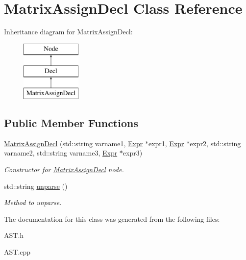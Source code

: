 \hypertarget{classMatrixAssignDecl}{\section{Matrix\-Assign\-Decl Class Reference}
\label{classMatrixAssignDecl}
}
Inheritance diagram for Matrix\-Assign\-Decl\-:\begin{figure}[H]
\begin{center}
\leavevmode
\includegraphics[height=3.000000cm]{classMatrixAssignDecl}
\end{center}
\end{figure}
\subsection*{Public Member Functions}
\begin{DoxyCompactItemize}
\item 
\hypertarget{classMatrixAssignDecl_a0a85b5acfef41aadd1a9a7f973e833f2}{\hyperlink{classMatrixAssignDecl_a0a85b5acfef41aadd1a9a7f973e833f2}{Matrix\-Assign\-Decl} (std\-::string varname1, \hyperlink{classExpr}{Expr} $\ast$expr1, \hyperlink{classExpr}{Expr} $\ast$expr2, std\-::string varname2, std\-::string varname3, \hyperlink{classExpr}{Expr} $\ast$expr3)}\label{classMatrixAssignDecl_a0a85b5acfef41aadd1a9a7f973e833f2}

\begin{DoxyCompactList}\small\item\em Constructor for \hyperlink{classMatrixAssignDecl}{Matrix\-Assign\-Decl} node. \end{DoxyCompactList}\item 
\hypertarget{classMatrixAssignDecl_a75fe092e7f4f5e138b4a79b8a6e86ca4}{std\-::string \hyperlink{classMatrixAssignDecl_a75fe092e7f4f5e138b4a79b8a6e86ca4}{unparse} ()}\label{classMatrixAssignDecl_a75fe092e7f4f5e138b4a79b8a6e86ca4}

\begin{DoxyCompactList}\small\item\em Method to unparse. \end{DoxyCompactList}\end{DoxyCompactItemize}


The documentation for this class was generated from the following files\-:\begin{DoxyCompactItemize}
\item 
A\-S\-T.\-h\item 
A\-S\-T.\-cpp\end{DoxyCompactItemize}
